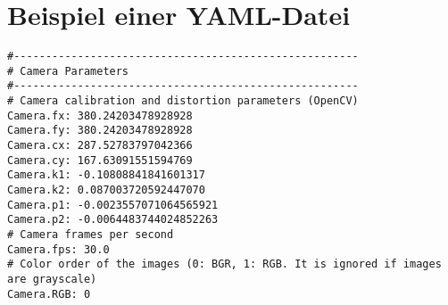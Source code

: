 
\section{Beispiel einer YAML-Datei}
\label{sec:yaml}

\begin{lstlisting}
#------------------------------------------------------
# Camera Parameters
#------------------------------------------------------
# Camera calibration and distortion parameters (OpenCV) 
Camera.fx: 380.24203478928928
Camera.fy: 380.24203478928928
Camera.cx: 287.52783797042366
Camera.cy: 167.63091551594769
Camera.k1: -0.10808841841601317
Camera.k2: 0.087003720592447070
Camera.p1: -0.0023557071064565921
Camera.p2: -0.0064483744024852263
# Camera frames per second 
Camera.fps: 30.0
# Color order of the images (0: BGR, 1: RGB. It is ignored if images are grayscale)
Camera.RGB: 0
\end{lstlisting}
